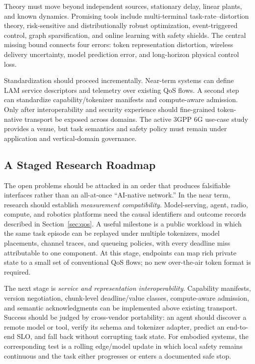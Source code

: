 \documentclass[letterpaper,journal]{IEEEtran}
\begin{document}
Theory must move beyond independent sources, stationary delay, linear plants,
and known dynamics. Promising tools include multi-terminal
task-rate--distortion theory, risk-sensitive and distributionally robust
optimization, event-triggered control, graph sparsification, and online
learning with safety shields. The central missing bound connects four errors:
token representation distortion, wireless delivery uncertainty, model
prediction error, and long-horizon physical control loss.

Standardization should proceed incrementally. Near-term systems can define
LAM service descriptors and telemetry over existing QoS flows. A second step
can standardize capability/tokenizer manifests and compute-aware admission.
Only after interoperability and security experience should fine-grained
token-native transport be exposed across domains. The active 3GPP 6G use-case
study \cite{3gpp22870} provides a venue, but task semantics and safety policy
must remain under application and vertical-domain governance.

\subsection{A Staged Research Roadmap}
The open problems should be attacked in an order that produces falsifiable
interfaces rather than an all-at-once ``AI-native network.'' In the near term,
research should establish \emph{measurement compatibility}. Model-serving,
agent, radio, compute, and robotics platforms need the causal identifiers and
outcome records described in Section~\ref{sec:qos}. A useful milestone is a
public workload in which the same task episode can be replayed under multiple
tokenizers, model placements, channel traces, and queueing policies, with
every deadline miss attributable to one component. At this stage, endpoints
can map rich private state to a small set of conventional QoS flows; no new
over-the-air token format is required.

The next stage is \emph{service and representation interoperability}.
Capability manifests, version negotiation, chunk-level deadline/value
classes, compute-aware admission, and semantic acknowledgments can be
implemented above existing transport. Success should be judged by
cross-vendor portability: an agent should discover a remote model or tool,
verify its schema and tokenizer adapter, predict an end-to-end SLO, and fall
back without corrupting task state. For embodied systems, the corresponding
test is a rolling edge/model update in which local safety remains continuous
and the task either progresses or enters a documented safe stop.
\end{document}
